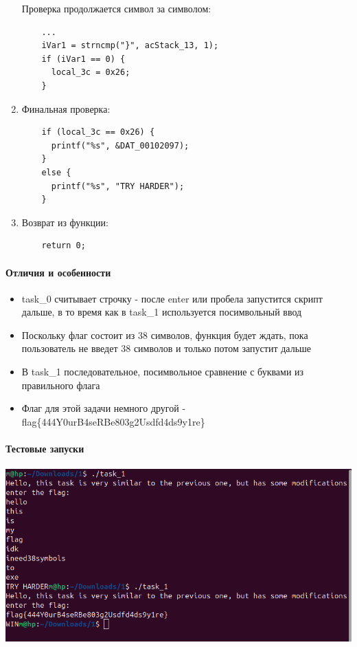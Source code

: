 \begin{enumerate}
    Проверка продолжается символ за символом:
    \begin{verbatim}
    ...
    iVar1 = strncmp("}", acStack_13, 1);
    if (iVar1 == 0) {
      local_3c = 0x26;
    }
    \end{verbatim}

    \item Финальная проверка:
    \begin{verbatim}
    if (local_3c == 0x26) {
      printf("%s", &DAT_00102097);
    }
    else {
      printf("%s", "TRY HARDER");
    }
    \end{verbatim}

    \item Возврат из функции:
    \begin{verbatim}
    return 0;
    \end{verbatim}
\end{enumerate}

\paragraph{Отличия и особенности}
\begin{itemize}
    \item task\_0 считывает строчку - после enter или пробела запустится скрипт дальше, в то время как в task\_1 используется посимвольный ввод

    \item Поскольку флаг состоит из 38 символов, функция будет ждать, пока пользователь не введет 38 символов и только потом запустит дальше

    \item В task\_1 последовательное, посимвольное сравнение с буквами из правильного флага

    \item Флаг для этой задачи немного другой - flag\{444Y0urB4seRBe803g2Usdfd4ds9y1re\}
\end{itemize}

\paragraph{Тестовые запуски}

\paragraph{}

\includegraphics[width=0.75\linewidth]{static/solution_task_1}

